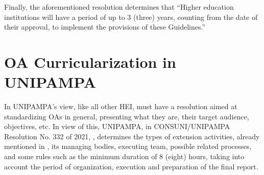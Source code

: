 
Finally, the aforementioned resolution determines that ``Higher education institutions will have a period of up to 3 (three) years, counting from the date of their approval, to implement the provisions of these Guidelines.''

\section{\acl{OA} Curricularization in \acl{UNIPAMPA}} \label{sec:3.2}



In \ac{UNIPAMPA}'s view, like all other \acl{HEI}, must have a resolution aimed at standardizing \acp{OA} in general, presenting what they are, their target audience, objectives, etc.
In view of this, \ac{UNIPAMPA}, in CONSUNI/UNIPAMPA Resolution No. 332 of 2021, \cite{Resolucao-332:2021}, determines the types of extension activities, already mentioned in , its managing bodies, executing team, possible related processes, and some rules such as the minimum duration of 8 (eight) hours, taking into account the period of organization, execution and preparation of the final report.

